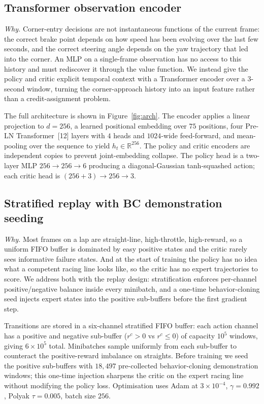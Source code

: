 \documentclass{article}
\begin{document}
\subsection{Transformer observation encoder}
\label{sec:encoder}

\emph{Why.} Corner-entry decisions are not instantaneous functions
of the current frame: the correct brake point depends on how speed
has been evolving over the last few seconds, and the correct
steering angle depends on the yaw trajectory that led into the
corner. An MLP on a single-frame observation has no access to this
history and must rediscover it through the value function. We
instead give the policy and critic explicit temporal context with
a Transformer encoder over a $3$-second window, turning the
corner-approach history into an input feature rather than a
credit-assignment problem.

The full architecture is shown in Figure~\ref{fig:arch}. The encoder
applies a linear projection to $d{=}256$, a learned
positional embedding over $75$ positions, four Pre-LN
Transformer~[12] layers with $4$ heads and $1024$-wide feed-forward,
and mean-pooling
over the sequence to yield $h_t \in \mathbb{R}^{256}$. The policy and
critic encoders are independent copies to prevent joint-embedding
collapse. The policy head is a two-layer MLP
$256\!\to\!256\!\to\!6$ producing a diagonal-Gaussian tanh-squashed
action; each critic head is $(256{+}3)\!\to\!256\!\to\!3$.

\subsection{Stratified replay with BC demonstration seeding}
\label{sec:replay}

\emph{Why.} Most frames on a lap are straight-line, high-throttle,
high-reward, so a uniform FIFO buffer is dominated by easy positive
states and the critic rarely sees informative failure states. And
at the start of training the policy has no idea what a competent
racing line looks like, so the critic has no expert trajectories to
score. We address both with the replay design: stratification
enforces per-channel positive/negative balance inside every
minibatch, and a one-time behavior-cloning seed injects expert
states into the positive sub-buffers before the first gradient
step.

Transitions are stored in a six-channel stratified FIFO buffer: each
action channel has a positive and negative sub-buffer ($r^c{>}0$ vs
$r^c{\le}0$) of capacity $10^5$ windows, giving $6{\times}10^5$
total. Minibatches sample uniformly from each sub-buffer to counteract
the positive-reward imbalance on straights. Before training we seed
the positive sub-buffers with $18{,}497$ pre-collected behavior-cloning
demonstration windows; this one-time injection sharpens the critic on
the expert racing line without modifying the policy loss. Optimisation
uses Adam at $3{\times}10^{-4}$, $\gamma{=}0.992$, Polyak
$\tau{=}0.005$, batch size $256$.
\end{document}
